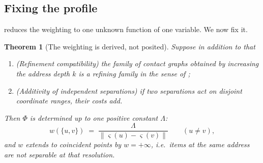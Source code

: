 \documentclass[11pt,twocolumn,a4paper]{article}
\theoremstyle{thmstyle}
\newtheorem{theorem}{Theorem}[section]
\theoremstyle{definition}
\theoremstyle{remark}
\newcommand{\wt}{w}
\newcommand{\sse}{\varsigma}
\newcommand{\norm}[1]{\lVert#1\rVert}
\begin{document}
\subsection{Fixing the profile}

 reduces the weighting to one unknown
function of one variable. We now fix it.

\begin{theorem}[The weighting is derived, not posited]
\label{thm:weighting-derived}
Suppose in addition to  that
\begin{enumerate}[label=(\alph*),leftmargin=*]
\item \emph{(Refinement compatibility)} the family of contact graphs
      obtained by increasing the address depth $k$ is a refining family
      in the sense of ;
\item \emph{(Additivity of independent separations)} if two separations
      act on disjoint coordinate ranges, their costs add.
\end{enumerate}
Then $\Phi$ is determined up to one positive constant $\Lambda$:
\begin{equation}
  \wt(\{u,v\}) \;=\;
  \frac{\Lambda}{\norm{\sse(u)-\sse(v)}}
  \qquad (u \neq v),
  \label{eq:wt-derived}
\end{equation}
and $\wt$ extends to coincident points by $\wt = +\infty$, i.e.\ items
at the same address are not separable at that resolution.
\end{theorem}
\end{document}
